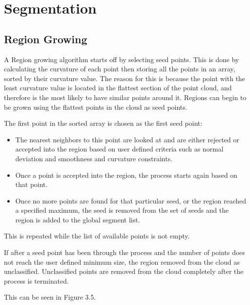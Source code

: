 \section{Segmentation}
\label{segmentation-method}
	\subsection{Region Growing}
		
		A Region growing algorithm starts off by selecting seed points. This is done by calculating the curvature of each point then storing all the points in an array, sorted by their curvature value. The reason for this is because the point with the least curvature value is located in the flattest section of the point cloud, and therefore is the most likely to have similar points around it. Regions can begin to be grown using the flattest points in the cloud as seed points. 
		
		The first point in the sorted array is chosen as the first seed point:
		
		\begin{itemize}
			
			\item The nearest neighbors to this point are looked at and are either rejected or accepted into the region based on user defined criteria such as normal deviation and smoothness and curvature constraints.
			
			\item Once a point is accepted into the region, the process starts again based on that point.
			
			\item Once no more points are found for that particular seed, or the region reached a specified maximum, the seed is removed from the set of seeds and the region is added to the global segment list. 
			
		\end{itemize}
		
		This is repeated while the list of available points is not empty.
		
		If after a seed point has been through the process and the number of points does not reach the user defined minimum size, the region removed from the cloud as unclassified. Unclassified points are removed from the cloud completely after the process is terminated. 
		
		This can be seen in Figure 3.5. %
		
